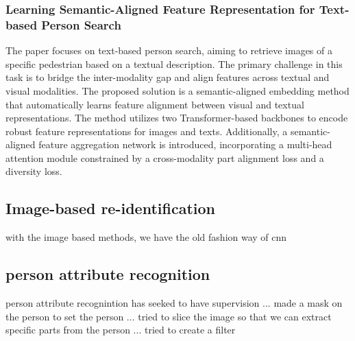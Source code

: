 \subsubsection{Learning Semantic-Aligned Feature Representation for Text-based Person Search}
The paper focuses on text-based person search, aiming to retrieve images of a specific pedestrian based on a textual description. The primary challenge in this task is to bridge the inter-modality gap and align features across textual and visual modalities. The proposed solution is a semantic-aligned embedding method that automatically learns feature alignment between visual and textual representations. The method utilizes two Transformer-based backbones to encode robust feature representations for images and texts. Additionally, a semantic-aligned feature aggregation network is introduced, incorporating a multi-head attention module constrained by a cross-modality part alignment loss and a diversity loss. 


\subsection{Image-based re-identification}
with the image based methods, we have the old fashion way of cnn 


\subsection{person attribute recognition}
person attribute recognintion has seeked to have supervision 
... made a mask on the person to set the person 
... tried to slice the image so that we can extract specific parts from the person
... tried to create a filter 


